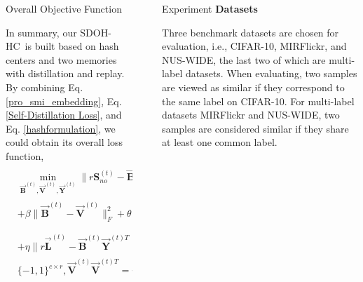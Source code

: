 \documentclass[final]{beamer}
\newlength{\sepwidth}
\newlength{\colwidth}
\newcommand{\separatorcolumn}{\begin{column}{\sepwidth}\end{column}}
\newcommand{\mymethodname}{SDOH-HC}
\begin{document}
\begin{frame}[t]
\begin{columns}[t]
\begin{column}{\colwidth}
				
				
				
				

				\begin{block}{Overall Objective Function}
					
					In summary, our \mymethodname~is built based on hash centers and two memories with distillation and replay. By combining Eq. \eqref{pro_smi_embedding}, Eq. \eqref{Self-Distillation Loss}, and Eq. \eqref{hashformulation}, we could obtain its overall loss function,
					\begin{equation}
						\begin{aligned}
							&\min_{\vec{\mathbf{B}}^{(t)},\vec{\mathbf{V}}^{(t)},\vec{\mathbf{Y}}^{(t)}} \| r\mathbf{S}_{no}^{(t)} - \vec{\mathbf{B}}^{(t)} \tilde{\mathbf{V}}^{(t)T} \|_{F}^{2} + \| r\mathbf{S}_{qn}^{(t)} - \tilde{\mathbf{B}}^{(t)}_{q} \vec{\mathbf{V}}^{(t)T} \|_{F}^{2} \\
							&+ \beta \| \vec{\mathbf{B}}^{(t)}-\vec{\mathbf{V}}^{(t)} \|_{F}^{2} + \theta (\| r\mathbf{K}-\tilde{\mathbf{Y}}^{(t)}  \vec{\mathbf{Y}}^{(t)T} \|_{F}^{2} +\|\mathbf{C}- \vec{\mathbf{Y}}^{(t)T}\|_{F}^{2} ) \\
							&+ \eta \| r \vec{\mathbf{L}}^{(t)} - \vec{\mathbf{B}}^{(t)} \vec{\mathbf{Y}}^{(t)T}  \|_F^2, \ \ \  s.t. \  \vec{\mathbf{B}}^{(t)} \in \{-1,1\}^{n_{t} \times r},\vec{\mathbf{Y}}^{(t)} \in  \\
							&  \{-1, 1\}^{c \times r},  \vec{\mathbf{V}}^{(t)}\vec{\mathbf{V}}^{(t)T} = n_{t} \mathbf{I}_{r}, \vec{\mathbf{V}}^{(t)}\mathbf{1} = \mathbf{0}_{r}.
						\end{aligned}
						\label{overallobjectivefunction}
					\end{equation}
					
					
					
					
				\end{block}
				
				
				
			\end{column}
			
			\separatorcolumn
			
			\begin{column}{\colwidth}
				
				\begin{block}{Experiment}
					\textbf{Datasets}
					
					Three benchmark datasets are chosen for evaluation, i.e., CIFAR-10, MIRFlickr, and NUS-WIDE, the last two of which are multi-label datasets. When evaluating, two samples are viewed as similar if they correspond to the same label on CIFAR-10. For multi-label datasets MIRFlickr and NUS-WIDE, two samples are considered similar if they share at least one common label.
					

\end{block}
\end{column}
\end{columns}
\end{frame}
\end{document}

